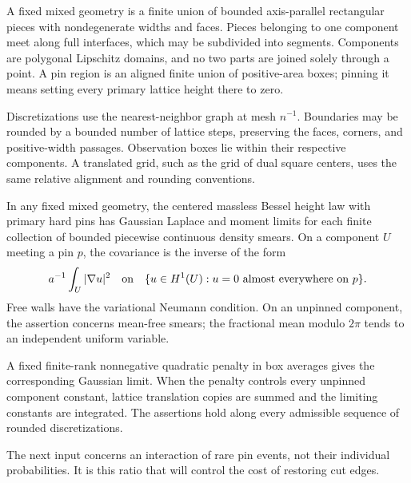 \begin{definition}\label{heights:geometry}
A fixed mixed geometry is a finite union of bounded axis-parallel
rectangular pieces with nondegenerate widths and faces. Pieces belonging
to one component meet along full interfaces, which may be subdivided
into segments. Components are polygonal Lipschitz domains, and no two
parts are joined solely through a point. A pin region is an aligned
finite union of positive-area boxes; pinning it means setting every
primary lattice height there to zero.

Discretizations use the nearest-neighbor graph at mesh \(n^{-1}\).
Boundaries may be rounded by a bounded number of lattice steps,
preserving the faces, corners, and positive-width passages. Observation
boxes lie within their respective components. A translated grid, such
as the grid of dual square centers, uses the same relative alignment
and rounding conventions.
\end{definition}

\begin{theorem}
\label{heights:mixed-input}
In any fixed mixed geometry, the centered massless Bessel height law
with primary hard pins has Gaussian Laplace and moment limits for each
finite collection of bounded piecewise continuous density smears.
On a component \(U\) meeting a pin \(p\), the covariance is the inverse
of the form
\[
  a^{-1}\int_U|\nabla u|^2
  \quad\hbox{on}\quad
  \{u\in H^1(U):u=0\text{ almost everywhere on }p\}.
\]
Free walls have the variational Neumann condition. On an unpinned
component, the assertion concerns mean-free smears; the fractional mean
modulo \(2\pi\) tends to an independent uniform variable.

A fixed finite-rank nonnegative quadratic penalty in box averages gives
the corresponding Gaussian limit. When the penalty controls every
unpinned component constant, lattice translation copies are summed and
the limiting constants are integrated. The assertions hold along
every admissible sequence of rounded discretizations.
\end{theorem}

The next input concerns an interaction of rare pin events, not their
individual probabilities. It is this ratio that will control the cost
of restoring cut edges.

